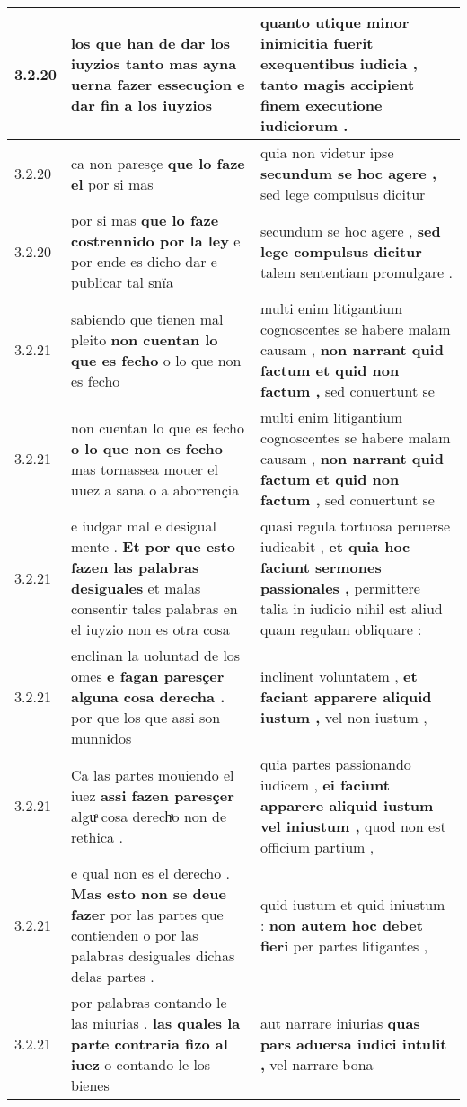 \begin{tabular}{|p{1cm}|p{6.5cm}|p{6.5cm}|}
3.2.20 & los que han de dar los iuyzios \textbf{ tanto mas ayna uerna fazer essecuçion } e dar fin a los iuyzios & quanto utique minor inimicitia fuerit exequentibus iudicia , \textbf{ tanto magis accipient } finem executione iudiciorum . \\\hline
3.2.20 & ca non paresçe \textbf{ que lo faze el } por si mas & quia non videtur ipse \textbf{ secundum se hoc agere , } sed lege compulsus dicitur \\\hline
3.2.20 & por si mas \textbf{ que lo faze costrennido por la ley } e por ende es dicho dar e publicar tal snïa & secundum se hoc agere , \textbf{ sed lege compulsus dicitur } talem sententiam promulgare . \\\hline
3.2.21 & sabiendo que tienen mal pleito \textbf{ non cuentan lo que es fecho } o lo que non es fecho & multi enim litigantium cognoscentes se habere malam causam , \textbf{ non narrant quid factum et quid non factum , } sed conuertunt se \\\hline
3.2.21 & non cuentan lo que es fecho \textbf{ o lo que non es fecho } mas tornassea mouer el uuez a sana o a aborrençia & multi enim litigantium cognoscentes se habere malam causam , \textbf{ non narrant quid factum et quid non factum , } sed conuertunt se \\\hline
3.2.21 & e iudgar mal e desigual mente . \textbf{ Et por que esto fazen las palabras desiguales } et malas consentir tales palabras en el iuyzio non es otra cosa & quasi regula tortuosa peruerse iudicabit , \textbf{ et quia hoc faciunt sermones passionales , } permittere talia in iudicio nihil est aliud quam regulam obliquare : \\\hline
3.2.21 & enclinan la uoluntad de los omes \textbf{ e fagan paresçer alguna cosa derecha . } por que los que assi son munnidos & inclinent voluntatem , \textbf{ et faciant apparere aliquid iustum , } vel non iustum , \\\hline
3.2.21 & Ca las partes mouiendo el iuez \textbf{ assi fazen paresçer } alguͣ cosa derechͣo non de rethica . & quia partes passionando iudicem , \textbf{ ei faciunt apparere aliquid iustum vel iniustum , } quod non est officium partium , \\\hline
3.2.21 & e qual non es el derecho . \textbf{ Mas esto non se deue fazer } por las partes que contienden o por las palabras desiguales dichas delas partes . & quid iustum et quid iniustum : \textbf{ non autem hoc debet fieri } per partes litigantes , \\\hline
3.2.21 & por palabras contando le las miurias . \textbf{ las quales la parte contraria fizo al iuez } o contando le los bienes & aut narrare iniurias \textbf{ quas pars aduersa iudici intulit , } vel narrare bona \\\hline

\end{tabular}
